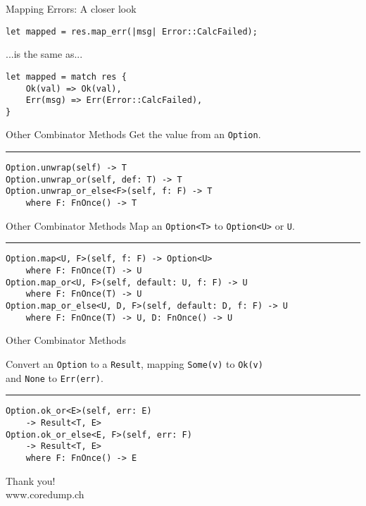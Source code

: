 \documentclass[aspectratio=1610,t]{beamer}
\newcommand\sep{\textcolor{lightgrey}{\rule{\linewidth}{0.05mm}}}
\begin{document}

\begin{frame}[fragile]{Mapping Errors: A closer look}
\begin{verbatim}
let mapped = res.map_err(|msg| Error::CalcFailed);
\end{verbatim}
...is the same as...
\begin{verbatim}
let mapped = match res {
    Ok(val) => Ok(val),
    Err(msg) => Err(Error::CalcFailed),
}
\end{verbatim}
\end{frame}


\begin{frame}[fragile]{Other Combinator Methods}
Get the value from an \texttt{Option}.
\sep
\begin{verbatim}
Option.unwrap(self) -> T
Option.unwrap_or(self, def: T) -> T
Option.unwrap_or_else<F>(self, f: F) -> T
    where F: FnOnce() -> T
\end{verbatim}
\end{frame}


\begin{frame}[fragile]{Other Combinator Methods}
Map an \texttt{Option<T>} to \texttt{Option<U>} or \texttt{U}.
\sep
\begin{verbatim}
Option.map<U, F>(self, f: F) -> Option<U>
    where F: FnOnce(T) -> U
Option.map_or<U, F>(self, default: U, f: F) -> U
    where F: FnOnce(T) -> U
Option.map_or_else<U, D, F>(self, default: D, f: F) -> U
    where F: FnOnce(T) -> U, D: FnOnce() -> U
\end{verbatim}
\end{frame}


\begin{frame}[fragile]{Other Combinator Methods}

Convert an \texttt{Option} to a \texttt{Result}, mapping \texttt{Some(v)} to
\texttt{Ok(v)}\\and \texttt{None} to \texttt{Err(err)}.
\sep
\begin{verbatim}
Option.ok_or<E>(self, err: E)
    -> Result<T, E>
Option.ok_or_else<E, F>(self, err: F)
    -> Result<T, E>
    where F: FnOnce() -> E
\end{verbatim}
\end{frame}


{
\begin{frame}[standout]
	\begin{centering}
	{\Huge Thank you!}\\
	{\normalsize www.coredump.ch}
	\end{centering}
\end{frame}
}
\end{document}

